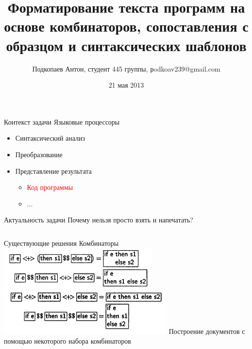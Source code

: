 \documentclass{beamer}
\begin{document}
\title
[Форматирование текста программ на основе комбинаторов, сопоставления с образцом и синтаксических шаблонов]
{Форматирование текста программ на основе комбинаторов, сопоставления с образцом и синтаксических шаблонов}
\author
[Подкопаев Антон]{Подкопаев Антон, студент 445 группы, \texttt podkoav239@gmail.com}
\date [21-05-13]{21 мая 2013}

\begin{frame}[plain]
	\titlepage
\end{frame}

\begin{frame}{Контекст задачи}
	Языковые процессоры

	\begin{block}{}
		\begin{itemize}
			\item Синтаксический анализ
			\item Преобразование
			\item Представление результата
			\begin{itemize}
				\item \textcolor{red}{Код программы}
				\item ...
			\end{itemize}
		\end{itemize}
	\end{block}

\end{frame}

\begin{frame}{Актуальность задачи}
	Почему нельзя просто взять и напечатать?
	\vspace{1cm}
	\inputminted{c}{codes/wikiExUnfor.c}
\end{frame}

\begin{frame}{Существующие решения}
	Комбинаторы
	\vspace{0.7cm}	
	\includegraphics[width = 1\linewidth]{images/a1.png}
	\includegraphics[width = 1\linewidth]{images/a2.png}
	\vspace{0.7cm}
	Построение документов с помощью некоторого набора комбинаторов
\end{frame}
\end{document}
